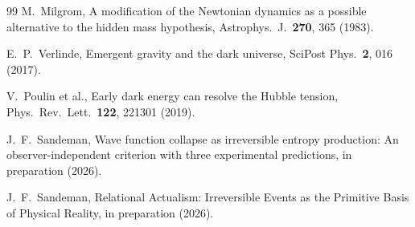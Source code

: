 \documentclass[11pt,twocolumn]{article}
\theoremstyle{plain}
\theoremstyle{remark}
\begin{document}
\begin{thebibliography}{99}
M.~Milgrom,
A modification of the Newtonian dynamics as a possible alternative
to the hidden mass hypothesis,
Astrophys.\ J.\ \textbf{270}, 365 (1983).

E.~P.~Verlinde,
Emergent gravity and the dark universe,
SciPost Phys.\ \textbf{2}, 016 (2017).

V.~Poulin et al.,
Early dark energy can resolve the Hubble tension,
Phys.\ Rev.\ Lett.\ \textbf{122}, 221301 (2019).

J.~F.~Sandeman,
Wave function collapse as irreversible entropy production:
An observer-independent criterion with three experimental predictions,
in preparation (2026).



J.~F.~Sandeman,
Relational Actualism: Irreversible Events as the Primitive Basis of
Physical Reality,
in preparation (2026).

\end{thebibliography}
\end{document}
